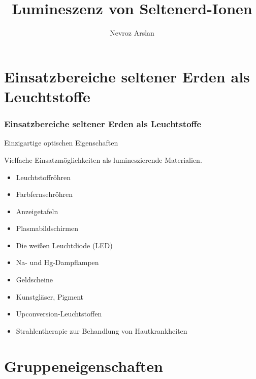 \documentclass{beamer}
\title{Lumineszenz von Seltenerd-Ionen}
\author{Nevroz Arslan}
\begin{document}
  {%
    \frame{\titlepage}
  }
\section{Einsatzbereiche seltener Erden als Leuchtstoffe} %

  \begin{frame}[t]\frametitle{Einsatzbereiche seltener Erden als Leuchtstoffe}

  \begin{beamerboxesrounded}[shadow=true]{}
    Einzigartige optischen Eigenschaften
  \end{beamerboxesrounded}
  \begin{beamerboxesrounded}[shadow=false]{}
    Vielfache Einsatzmöglichkeiten als lumineszierende Materialien.
  \end{beamerboxesrounded}
\pause
    \begin{itemize}
      \item Leuchtstoffröhren
      \item Farbfernsehröhren
      \item Anzeigetafeln
      \item Plasmabildschirmen
      \item Die weißen Leuchtdiode (LED)
      \item Na- und Hg-Dampflampen
      \item Geldscheine
      \item Kunstgläser, Pigment
      \item Upconversion-Leuchtstoffen
      \item Strahlentherapie zur Behandlung von Hautkrankheiten
    \end{itemize}
  \end{frame}

\section{Gruppeneigenschaften} %
\end{document}
